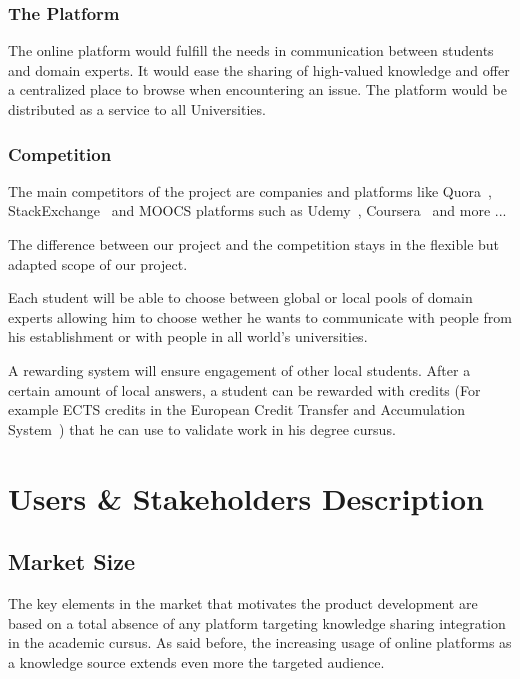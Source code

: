 \documentclass[12pt,a4paper,oneside, titlepage]{article}
\begin{document}
	    \subsubsection{The Platform}
		The online platform would fulfill the needs in communication between students and domain experts. It 
		would ease the sharing of high-valued knowledge and offer a centralized place to browse when 
		encountering an issue. The platform would be distributed as a service to all Universities.
		
	    \subsubsection{Competition}
		The main competitors of the project are companies and platforms like Quora~\cite{quoraWebsite}, 
		StackExchange~\cite{stackExchangeWebsite} and MOOCS platforms such as Udemy~\cite{udemyWebsite}, 
		Coursera~\cite{courseraWebsite} and more ... \newline
		
		The difference between our project and the competition stays in the flexible but adapted scope of our 
		project. \newline 
		
		Each student will be able to choose between global or local pools of domain experts allowing him to 
		choose wether he wants to communicate with people from his establishment or with people in all world's 
		universities. \newline
		
		A rewarding system will ensure engagement of other local students. After a certain amount 
		of local answers, a student can be rewarded with credits (For example ECTS credits in the European 
		Credit Transfer and Accumulation System~\cite{ectsWiki}) that he 
		can use to validate work in his degree cursus. 
		
    \newpage
	\section{Users \& Stakeholders Description}
	\subsection{Market Size}
	The key elements in the market that motivates the product development are based on a total absence of any platform 
	targeting knowledge sharing integration in the academic cursus. As said before, the increasing usage of online
	platforms as a knowledge source extends even more the targeted audience. \newline
	
\end{document}
